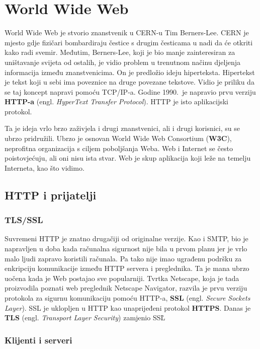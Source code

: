 
\section[World Wide Web]{World Wide Web}

World Wide Web je stvorio znanstvenik u CERN-u Tim Berners-Lee.
CERN je mjesto gdje fizičari bombardiraju čestice s drugim česticama u nadi da će otkriti kako radi svemir.
Međutim, Berners-Lee, koji je bio manje zainteresiran za uništavanje svijeta od ostalih, je vidio problem u trenutnom načinu djeljenja informacija između znanstvenicima.
On je predložio ideju hiperteksta.
Hipertekst je tekst koji u sebi ima poveznice na druge povezane tekstove.
Vidio je priliku da se taj koncept napravi pomoću TCP/IP-a.
Godine 1990.\ je napravio prvu verziju \textbf{HTTP-a} (engl. \textit{HyperText Transfer Protocol}).
HTTP je isto aplikacijski protokol.

Ta je ideja vrlo brzo zaživjela i drugi znanstvenici, ali i drugi korisnici, su se ubrzo pridružili.
Ubrzo je osnovan World Wide Web Consortium (\textbf{W3C}), neprofitna organizacija s ciljem poboljšanja Weba.
Web i Internet se često poistovjećuju, ali oni nisu ista stvar.
Web je skup aplikacija koji leže na temelju Interneta, kao što vidimo.

\subsection{HTTP i prijatelji}

\subsubsection{TLS/SSL}

Suvremeni HTTP je znatno drugačiji od originalne verzije.
Kao i SMTP, bio je napravljen u doba kada računalna sigurnost nije bila u prvom planu jer je vrlo malo ljudi zapravo koristili računala.
Pa tako nije imao ugrađenu podršku za enkripciju komunikacije između HTTP servera i preglednika.
Ta je mana ubrzo uočena kada je Web postajao sve popularniji.
Tvrtka Netscape, koja je tada proizvodila poznati web preglednik Netscape Navigator, razvila je prvu verziju protokola za sigurnu komunikaciju pomoću HTTP-a, \textbf{SSL} (engl. \textit{Secure Sockets Layer}).
SSL je uklopljen u HTTP kao unaprijeđeni protokol \textbf{HTTPS}.
Danas je \textbf{TLS} (engl. \textit{Transport Layer Security}) zamjenio SSL\.

\subsubsection{Klijenti i serveri}

